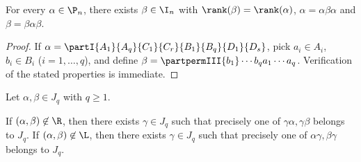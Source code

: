 \begin{lemma}
\label{lemma-aa1}
For every $\alpha\in\P_n$, there exists $\beta\in\I_n$ with $\rank(\beta)=\rank(\alpha)$, $\alpha=\alpha\beta\alpha$ and $\beta=\beta\alpha\beta$.
\end{lemma}


\begin{proof}
If $\alpha=\partI{A_1}{A_q}{C_1}{C_r}{B_1}{B_q}{D_1}{D_s}$, pick $a_i\in A_i$, $b_i\in B_i$ ($i=1,\ldots,q$), and define $\beta=\partpermIII{b_1}\cdots{b_q}{a_1}\cdots{a_q}$. Verification of the stated properties is immediate.
\end{proof}

\newpage

\begin{lemma}
\label{lemma-aa1b}
Let $\alpha,\beta\in J_q$ with $q\geq1$.
\begin{itemize}
 If $(\alpha,\beta)\not\in{\R}$, then there exists $\gamma\in J_q$ such that precisely one of $\gamma\alpha,\gamma\beta$ belongs to $J_q$.
 If $(\alpha,\beta)\not\in{\L}$, then there exists $\gamma\in J_q$  such that precisely one of $\alpha\gamma,\beta\gamma$ belongs to $J_q$.
\end{itemize}
\end{lemma}

